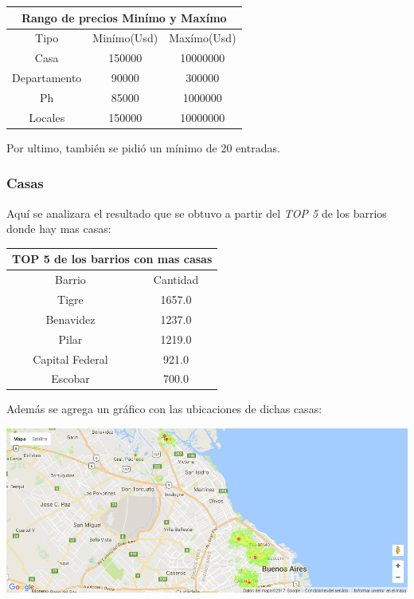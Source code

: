 \documentclass[a4paper, 10pt]{article}
\begin{document}
				\begin{center}
						\begin{tabular}{ |c|c|c| }
							\hline
							\multicolumn{3}{|c|}{Rango de precios Minímo y Maxímo}\\
							\hline
							\hline
							Tipo & Minímo(Usd) & Maxímo(Usd)\\
							\hline
							Casa & 150000 & 10000000\\
							Departamento & 90000 &300000\\
							Ph & 85000 & 1000000\\
							Locales & 150000 & 10000000\\
							\hline
						\end{tabular}
					\end{center}
				Por ultimo, también se pidió un mínimo de 20 entradas.

				\subsubsection{Casas}

				Aquí se analizara el resultado que se obtuvo a partir del \emph{TOP 5} de los barrios donde hay mas casas:

				\begin{center}
						\begin{tabular}{ |c|c| }
							\hline
							\multicolumn{2}{|c|}{TOP 5 de los barrios con mas casas}\\
							\hline
							\hline
							Barrio & Cantidad\\
							\hline
							Tigre & 1657.0 \\ 
							Benavidez & 1237.0 \\
							Pilar & 1219.0 \\ 
							Capital Federal & 921.0 \\
							Escobar & 700.0 \\
							\hline
						\end{tabular}
					\end{center}

				Además se agrega un gráfico con las ubicaciones de dichas casas:

				\begin{center}
   		    				\includegraphics[width=\textwidth]{images/ubicMasCasas}
				\end{center}
\end{document}
